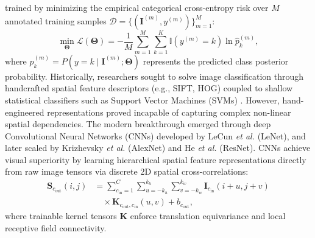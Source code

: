 \documentclass[pdflatex,sn-mathphys-num]{sn-jnl}%
\theoremstyle{thmstyleone}%
\theoremstyle{thmstyletwo}%
\theoremstyle{thmstylethree}%
\begin{document}
trained by minimizing the empirical categorical cross-entropy risk over $M$ annotated training samples $\mathcal{D} = \{(\mathbf{I}^{(m)}, y^{(m)})\}_{m=1}^M$:
\begin{equation}
\min_{\boldsymbol{\Theta}} \mathcal{L}(\boldsymbol{\Theta}) = -\frac{1}{M} \sum_{m=1}^M \sum_{k=1}^K \mathbb{I}(y^{(m)} = k) \ln \hat{p}_k^{(m)},
\label{eq:cross_entropy_objective}
\end{equation}
where $\hat{p}_k^{(m)} = P(y = k \mid \mathbf{I}^{(m)}; \boldsymbol{\Theta})$ represents the predicted class posterior probability. Historically, researchers sought to solve image classification through handcrafted spatial feature descriptors (e.g., SIFT, HOG) coupled to shallow statistical classifiers such as Support Vector Machines (SVMs) \cite{cortes1995support, rebentrost2014quantum}. However, hand-engineered representations proved incapable of capturing complex non-linear spatial dependencies. The modern breakthrough emerged through deep Convolutional Neural Networks (CNNs) developed by LeCun \textit{et al.} \cite{lecun1998gradient} (LeNet), and later scaled by Krizhevsky \textit{et al.} \cite{krizhevsky2012imagenet} (AlexNet) and He \textit{et al.} \cite{he2016deep} (ResNet). CNNs achieve visual superiority by learning hierarchical spatial feature representations directly from raw image tensors via discrete 2D spatial cross-correlations:
\begin{align}
\mathbf{S}_{c_{\mathrm{out}}}(i, j) &= \sum_{c_{\mathrm{in}}=1}^C \sum_{u=-k_h}^{k_h} \sum_{v=-k_w}^{k_w} \mathbf{I}_{c_{\mathrm{in}}}(i+u, j+v) \nonumber \\
&\quad \times \mathbf{K}_{c_{\mathrm{out}}, c_{\mathrm{in}}}(u, v) + b_{c_{\mathrm{out}}},
\label{eq:classical_conv_math}
\end{align}
where trainable kernel tensors $\mathbf{K}$ enforce translation equivariance and local receptive field connectivity.
\end{document}
